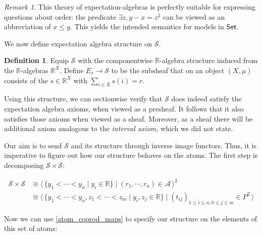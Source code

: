 \documentclass[a4paper]{amsproc}
\theoremstyle{plain}
\theoremstyle{definition}
\newtheorem{definition}[theorem]{Definition}
\theoremstyle{remark}
\newtheorem{remark}[theorem]{Remark}
\numberwithin{equation}{section}
\newcommand{\Set}{\textup{\textsf{Set}}}
\newcommand{\la}{\langle\,}
\newcommand{\ra}{\,\rangle}
\begin{document}
\begin{remark}
    This theory of expectation-algebras is perfectly suitable for expressing questions about order: the predicate $\exists z, y - x = z^2$ can be viewed as an abbreviation of $x \le y$. This yields the intended semantics for models in $\Set$.
\end{remark}

We now define expectation algebra structure on $\mathcal{S}$.

\begin{definition}
    Equip $\mathcal{S}$ with the componentwise $\mathbb{R}$-algebra structure induced from the $\mathbb{R}$-algebras $\mathbb{R}^X$. Define $E_r \xrightarrow{} \mathcal{S}$ to be the subsheaf that on an object $(X,\mu)$ consists of the $s \in \mathbb{R}^X$ with $\sum_{i \in X} s(i) = r$.
\end{definition}

Using this structure, we can sectionwise verify that $\mathcal{S}$ does indeed satisfy the expectation algebra axioms, when viewed as a presheaf. It follows that it also satisfies those axioms when viewed as a sheaf. Moreover, as a sheaf there will be additional axiom analogous to the \emph{interval axiom}, which we did not state.

Our aim is to send $\mathcal{S}$ and its structure through inverse image functors. Thus, it is imperative to figure out how our structure behaves on the atoms. The first step is decomposing $\mathcal{S} \times \mathcal{S}$:

\begin{align*}
    \mathcal{S} \times \mathcal{S} &\cong \la \{y_1 < \cdots < y_n \mid y_i \in \mathbb{R} \} \mid (r_1, \cdots, r_n) \in \mathcal{A} \ra^2 \\
    &\cong \la \{y_1 < \cdots < y_n, z_1 < \cdots < z_m \mid y_i, z_j \in \mathbb{R} \} \mid (t_{ij})_{1 \leq i \leq n, 0 \leq j \leq m} \in P^2\ra
\end{align*}

Now we can use \ref{atom_coprod_maps} to specify our structure on the elements of this set of atoms:
\end{document}
